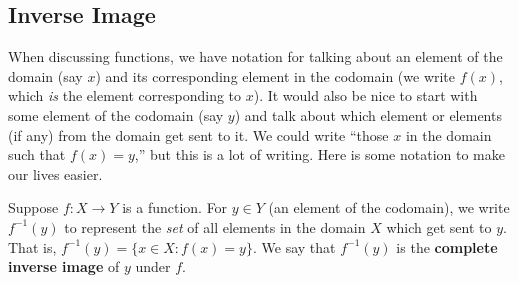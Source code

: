 \documentclass[10pt,]{book}
\newcommand{\terminology}[1]{\textbf{#1}}
\theoremstyle{plain}
\theoremstyle{definition}
\theoremstyle{definition}
\theoremstyle{definition}
\numberwithin{equation}{section}
\def\inv{^{-1}}
\def\st{:}
\begin{document}
\subsection[Inverse Image]{Inverse Image}\label{subsection-9}

      When discussing functions, we have notation for talking about an element of the domain (say \(x\)) and its corresponding element in the codomain (we write \(f(x)\), which \emph{is} the element corresponding to \(x\)). It would also be nice to start with some element of the codomain (say \(y\)) and talk about which element or elements (if any) from the domain get sent to it. We could write ``those \(x\) in the domain such that \(f(x) = y\),'' but this is a lot of writing. Here is some notation to make our lives easier.
\par

      Suppose \(f:X \to Y\) is a function. For \(y \in Y\) (an element of the codomain), we write \(f\inv(y)\)\label{notation-4}
 to represent the \emph{set} of all elements in the domain \(X\) which get sent to \(y\). That is, \(f\inv(y) = \{x \in X \st f(x) = y\}\). We say that \(f\inv(y)\) is the
      \terminology{complete inverse image} of \(y\) under \(f\).
\par
\end{document}
